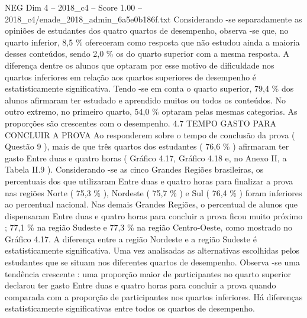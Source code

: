 \begin{textsample}{NEG Dim 4 – 2018\_c4 – Score 1.00 – 2018\_c4/enade\_2018\_admin\_6a5e0b186f.txt}
Considerando -se separadamente as opiniões de estudantes dos quatro quartos de desempenho, observa -se que, no quarto inferior, 8,5 \% ofereceram como resposta que não estudou ainda a maioria desses conteúdos, sendo 2,0 \% os do quarto superior com a mesma resposta.
A diferença dentre os alunos que optaram por esse motivo de dificuldade nos quartos inferiores em relação aos quartos superiores de desempenho é estatisticamente significativa.
Tendo -se em conta o quarto superior, 79,4 \% dos alunos afirmaram ter estudado e aprendido muitos ou todos os conteúdos.
No outro extremo, no primeiro quarto, 54,0 \% optaram pelas mesmas categorias.
As proporções são crescentes com o desempenho. 4.7 TEMPO GASTO PARA CONCLUIR A PROVA Ao responderem sobre o tempo de conclusão da prova ( Questão 9 ), mais de que três quartos dos estudantes ( 76,6 \% ) afirmaram ter gasto Entre duas e quatro horas ( Gráfico 4.17, Gráfico 4.18 e, no Anexo II, a Tabela II.9 ).
Considerando -se as cinco Grandes Regiões brasileiras, os percentuais dos que utilizaram Entre duas e quatro horas para finalizar a prova nas regiões Norte ( 75,3 \% ), Nordeste ( 75,7 \% ) e Sul ( 76,4 \% ) foram inferiores ao percentual nacional.
Nas demais Grandes Regiões, o percentual de alunos que dispensaram Entre duas e quatro horas para concluir a prova ficou muito próximo ; 77,1 \% na região Sudeste e 77,3 \% na região Centro-Oeste, como mostrado no Gráfico 4.17.
A diferença entre a região Nordeste e a região Sudeste é estatisticamente significativa.
Uma vez analisadas as alternativas escolhidas pelos estudantes que se situam nos diferentes quartos de desempenho.
Observa -se uma tendência crescente : uma proporção maior de participantes no quarto superior declarou ter gasto Entre duas e quatro horas para concluir a prova quando comparada com a proporção de participantes nos quartos inferiores.
Há diferenças estatisticamente significativas entre todos os quartos de desempenho.

\end{textsample}
